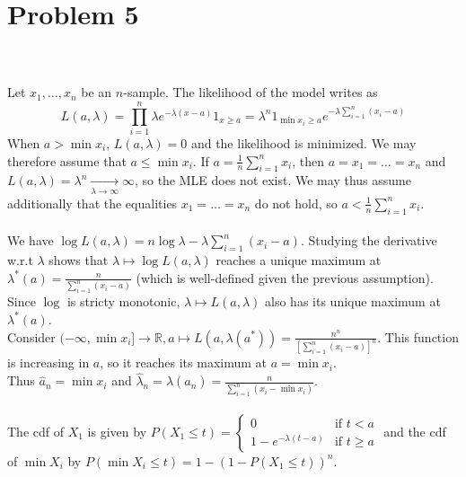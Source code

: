 \documentclass[a4paper,11pt]{article}
\begin{document}
\newpage
\section*{Problem 5}
\noindent{}
\\ \\
Let $x_1,\ldots,x_n$ be an $n$-sample. The likelihood of the model writes as $$L(a,\lambda) = \prod_{i=1}^n \lambda e^{-\lambda(x-a)}1_{x\geq a} = \lambda^n 1_{\min x_i \geq a} e^{-\lambda\sum_{i=1}^n(x_i-a)}$$
When $a>\min x_i$, $L(a,\lambda)=0$ and the likelihood is minimized. We may therefore assume that $a\leq \min x_i$. If $a=\frac 1n \sum_{i=1}^n x_i$, then $a=x_1=\ldots=x_n$ and $L(a,\lambda) = \lambda^n \xrightarrow[\lambda\to \infty]{} \infty$, so the MLE does not exist. We may thus assume additionally that the equalities $x_1=\ldots=x_n$ do not hold, so $a<\frac 1n \sum_{i=1}^n x_i$.\\\\
We have $\log L(a,\lambda) = n\log \lambda  -\lambda \sum_{i=1}^n(x_i-a)$. Studying the derivative w.r.t $\lambda$ shows that $\lambda\mapsto \log L(a,\lambda)$ reaches a unique maximum at $\displaystyle \lambda^*(a) = \frac{n}{\sum_{i=1}^n (x_i-a)}$ (which is well-defined given the previous assumption). Since $\log$ is stricty monotonic,  $\lambda\mapsto L(a,\lambda)$ also has its unique maximum at $\lambda^*(a)$. \\
Consider $(-\infty, \min x_i]\to \mathbb R, a\mapsto  L(a,\lambda(a^*)) = \frac{n^n}{\left[\sum_{i=1}^n(x_i-a)\right]^n}$. This function is increasing in $a$, so it reaches its maximum at $a = \min x_i$.\\ Thus $\hat a_n = \min x_i$ and $\hat \lambda_n = \lambda(\hat a_n) = \frac{n}{\sum_{i=1}^n (x_i -\min x_i)}$.\\
\\
The cdf of $X_1$ is given by $P(X_1\leq t) = \begin{cases}
  0 &\text{if } t<a\\
  1-e^{-\lambda(t-a)} &\text{if } t\geq a
\end{cases}$ and the cdf of $\min X_i$ by $P(\min X_i \leq t)=1-(1-P(X_1\leq t))^n$. \\
\end{document}
